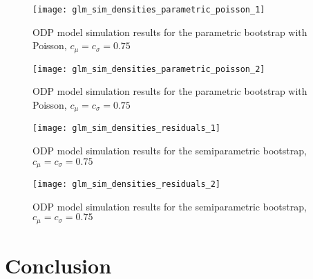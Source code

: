 \documentclass[a4paper]{book}
\begin{document}
\begin{landscape}
  \begin{figure}
    \centering
    \texttt{[image: glm\_sim\_densities\_parametric\_poisson\_1]}
    \caption{ODP model simulation results for the parametric bootstrap with Poisson, $c_\mu = c_\sigma = 0.75$}
    \label{fig:fig:glm-sim-param-pois}
  \end{figure}
\end{landscape}

\begin{landscape}
  \begin{figure}
    \ContinuedFloat
    \captionsetup{list=off,format=cont}
    \centering
    \texttt{[image: glm\_sim\_densities\_parametric\_poisson\_2]}
    \caption{ODP model simulation results for the parametric bootstrap with Poisson, $c_\mu = c_\sigma = 0.75$}
  \end{figure}
\end{landscape}

\begin{landscape}
  \begin{figure}
    \centering
    \texttt{[image: glm\_sim\_densities\_residuals\_1]}
    \caption{ODP model simulation results for the semiparametric bootstrap, $c_\mu = c_\sigma = 0.75$}
    \label{fig:fig:glm-sim-semiparam}
  \end{figure}
\end{landscape}

\begin{landscape}
  \begin{figure}
    \ContinuedFloat
    \captionsetup{list=off,format=cont}
    \centering
    \texttt{[image: glm\_sim\_densities\_residuals\_2]}
    \caption{ODP model simulation results for the semiparametric bootstrap, $c_\mu = c_\sigma = 0.75$}
  \end{figure}
\end{landscape}

\restoregeometry

\backmatter%

\chapter{Conclusion} \label{conclusion}

\printbibliography%
\end{document}

